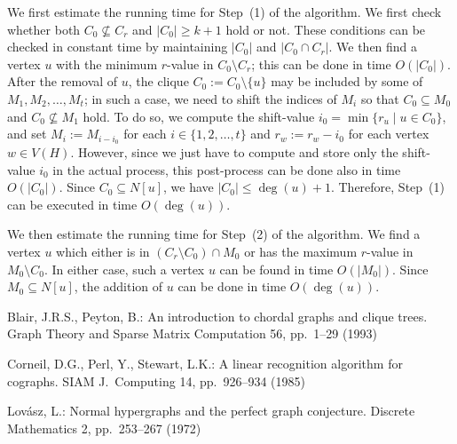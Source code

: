 \documentclass{llncs}
\newcommand{\ini}{0}
\newcommand{\tar}{r}
\newcommand{\cliq}{C}
\newcommand{\subH}{H}
\newcommand{\intH}{\subH}
\newcounter{one}
\begin{document}
	We first estimate the running time for Step~(1) of the algorithm. 
	We first check whether both $\cliq_{\ini} \not\subseteq \cliq_{\tar}$ and $|\cliq_{\ini}| \ge k+1$ hold or not. 
	These conditions can be checked in constant time by maintaining $|\cliq_{\ini}|$ and $|\cliq_{\ini} \cap \cliq_{\tar}|$.
	We then find a vertex $u$ with the minimum $r$-value in $\cliq_{\ini} \setminus \cliq_{\tar}$; this can be done in time $O(|\cliq_{\ini}|)$.
	After the removal of $u$, the clique $C_{\ini}:=C_{\ini} \setminus \{u\}$ may be included by some of $M_{1}, M_{2}, \ldots, M_{t}$; 
in such a case, we need to shift the indices of $M_i$ so that $\cliq_{\ini} \subseteq M_{0}$ and $\cliq_{\ini} \not\subseteq M_{1}$ hold. 
	To do so, we compute the shift-value $i_{0} = \min\{r_{u} \mid u \in \cliq_{\ini}\}$, and set $M_{i} := M_{i - i_{0}}$ for each $i \in \{1,2,\ldots, t\}$ and $r_{w} := r_{w} - i_{0}$ for each vertex $w \in V(\intH)$.
	However, since we just have to compute and store only the shift-value $i_{0}$ in the actual process, this post-process can be done also in time $O(|\cliq_{\ini}|)$.
	Since $\cliq_{\ini} \subseteq N[u]$, we have $|\cliq_{\ini}| \le \deg(u) + 1$.
	Therefore, Step~(1) can be executed in time $O(\deg(u))$.

	We then estimate the running time for Step~(2) of the algorithm. 
	We find a vertex $u$ which either is in $(\cliq_{\tar} \setminus \cliq_{\ini}) \cap M_{0}$ or has the maximum $r$-value in $M_{0} \setminus \cliq_{\ini}$.
	In either case, such a vertex $u$ can be found in time $O(|M_{0}|)$.
	Since $M_{0} \subseteq N[u]$, the addition of $u$ can be done in time $O(\deg(u))$.



\begin{thebibliography}{[BPS85]}
Blair, J.R.S., Peyton, B.:
An introduction to chordal graphs and clique trees.
Graph Theory and Sparse Matrix Computation 56, pp.~1--29 (1993)

Corneil, D.G., Perl, Y., Stewart, L.K.:
A linear recognition algorithm for cographs.
SIAM J.~Computing 14, pp.~926--934 (1985)

Lov{\'{a}}sz, L.:
Normal hypergraphs and the perfect graph conjecture.
Discrete Mathematics 2, pp.~253--267 (1972)
\end{thebibliography}

 
\end{document}
